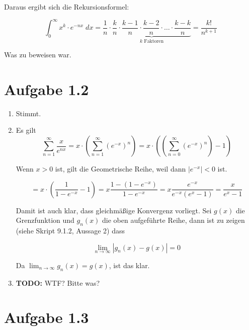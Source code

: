 \documentclass[a4paper,german,12pt,smallheadings]{scrartcl}
\begin{document}
Daraus ergibt sich die Rekursionsformel:

\begin{equation*}
  \int_0^\infty x^k \cdot e^{-nx} \; dx = \frac{1}{n} \cdot \underbrace{\frac{k}{n} \cdot \frac{k-1}{n} \cdot \frac{k-2}{n} \cdot \dots \cdot \frac{k-k}{n}}_{k\text{ Faktoren}} = \frac{k!}{n^{k+1}}
\end{equation*}

Was zu beweisen war.

\section*{Aufgabe 1.2}

\begin{enumerate}[(1)]
\item Stimmt.
\item Es gilt
  \begin{equation*}
    \sum_{n=1}^\infty \frac{x}{e^{nx}} = x \cdot \left(\sum_{n=1}^\infty \left(e^{-x}\right)^n\right) = x \cdot \left(\left(\sum_{n=0}^\infty \left(e^{-x}\right)^n\right) - 1\right)
  \end{equation*}

  Wenn $x>0$ ist, gilt die Geometrische Reihe, weil dann $|e^{-x}| < 0$ ist.

  \begin{equation*}
    = x \cdot \left( \frac{1}{1-e^{-x}} - 1 \right) = x \frac{1 - (1-e^{-x})}{1-e^{-x}} = x \frac{e^{-x}}{e^{-x} (e^x - 1)} = \frac{x}{e^x-1}
  \end{equation*}

  Damit ist auch klar, dass gleichmäßige Konvergenz vorliegt. Sei $g(x)$ die
  Grenzfunktion und $g_n(x)$ die oben aufgeführte Reihe, dann ist zu zeigen
  (siehe Skript 9.1.2, Aussage 2) dass

  \begin{equation*}
    \lim_{n \to \infty} |g_n(x) - g(x)| = 0
  \end{equation*}

  Da $\lim_{n \to \infty} g_n(x) = g(x)$, ist das klar.

\item \textbf{TODO:} WTF? Bitte was?
\end{enumerate}

\section*{Aufgabe 1.3}
\end{document}
